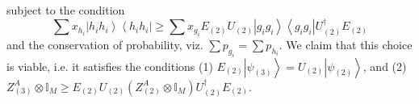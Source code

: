 \documentclass{article}
\begin{document}
\begin{enumerate}
\begin{footnotesize}
        \end{footnotesize}

        subject to the condition
        \begin{equation}
          \sum x_{h_{i}}\left|h_{i}h_{i}\right\rangle \left\langle h_{i}h_{i}\right|\ge\sum x_{g_{i}}E_{(2)}U_{(2)}\left|g_{i}g_{i}\right\rangle \left\langle g_{i}g_{i}\right|U_{(2)}^\dagger E_{(2)}\label{eq:MainConstraintInequality}
        \end{equation}
        and the conservation of probability, viz. $\sum p_{g_{i}}=\sum p_{h_{i}}$.
        We claim that this choice is viable, i.e. it satisfies the conditions
        (1) $E_{(2)}\left|\psi_{(3)}\right\rangle =U_{(2)}\left|\psi_{(2)}\right\rangle$, and (2) $Z_{(3)}^{A}\otimes\mathbb{I}_{M}\ge E_{(2)}U_{(2)}\left(Z_{(2)}^{A}\otimes\mathbb{I}_{M}\right)U^\dagger_{(2)}E_{(2)}.$


\end{enumerate}
\end{document}
